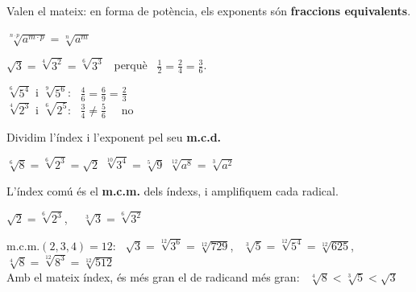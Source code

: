 \documentclass[11pt,a4paper]{article}
\newcommand{\be}[1]{{\color{fmok}\faCheckCircle}\ \ensuremath{#1}}
\newcommand{\mal}[1]{{\color{fmR}\faTimesCircle}\ {\color{fmR}\ensuremath{#1}}}
\begin{document}
\vfill
\begin{minipage}[c]{0.55\linewidth}
\begin{idea}
Valen el mateix: en forma de potència, els exponents són \textbf{fraccions equivalents}.\\[4pt]
{\centering\Large$\sqrt[n\cdot p]{a^{m\cdot p}}=\sqrt[n]{a^m}$\par}\smallskip
$\sqrt3=\sqrt[4]{3^2}=\sqrt[6]{3^3}$ \ perquè \ $\frac12=\frac24=\frac36$.
\end{idea}
\end{minipage}\hfill
\begin{minipage}[c]{0.42\linewidth}
\begin{exemple}
$\sqrt[6]{5^4}$ i $\sqrt[9]{5^6}$: \ $\frac46=\frac69=\frac23$ \ \be{}\\[3pt]
$\sqrt[4]{2^3}$ i $\sqrt[6]{2^5}$: \ $\frac34\neq\frac56$ \ \mal{\text{no}}
\end{exemple}
\end{minipage}

\vfill
\begin{tcbraster}[raster columns=2,raster equal height,raster column skip=10pt]
\begin{tcolorbox}[fmbase,colback=fmK!8,colframe=fmK,coltitle=white,title={\faSearchMinus\ \ Simplificar}]
Dividim l'índex i l'exponent pel seu \textbf{m.c.d.}\par\smallskip
$\sqrt[6]{8}=\sqrt[6]{2^3}=\sqrt2$ \qquad $\sqrt[10]{3^4}=\sqrt[5]{9}$ \qquad $\sqrt[12]{a^8}=\sqrt[3]{a^2}$
\end{tcolorbox}
\begin{tcolorbox}[fmbase,colback=fmA!8,colframe=fmA,coltitle=white,title={\faSearchPlus\ \ Reduir a índex comú}]
L'índex comú és el \textbf{m.c.m.} dels índexs, i amplifiquem cada radical.\par\smallskip
$\sqrt2=\sqrt[6]{2^3}$, \ \ $\sqrt[3]{3}=\sqrt[6]{3^2}$
\end{tcolorbox}
\end{tcbraster}

\vfill
\begin{exemple}
m.c.m.$(2,3,4)=12$: \ $\sqrt3=\sqrt[12]{3^6}=\sqrt[12]{729}$, \ $\sqrt[3]{5}=\sqrt[12]{5^4}=\sqrt[12]{625}$, \ $\sqrt[4]{8}=\sqrt[12]{8^3}=\sqrt[12]{512}$\\[4pt]
Amb el mateix índex, és més gran el de radicand més gran: \ $\boxed{\sqrt[4]{8}<\sqrt[3]{5}<\sqrt3}$
\end{exemple}
\end{document}
